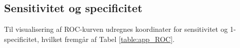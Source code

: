 
\subsection{Sensitivitet og specificitet} \label{App:ROC}
Til visualisering af ROC-kurven udregnes koordinater for sensitivitet og 1-specificitet, hvilket fremgår af Tabel  \ref{table:app_ROC}.

